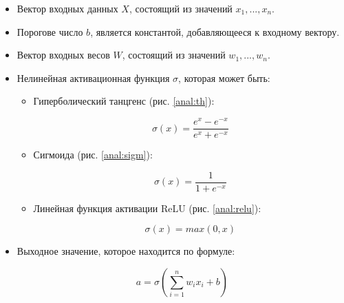 \begin{itemize}
	\item Вектор входных данных $X$, состоящий из значений $x_1, ..., x_n$.
	\item Порогове число $b$, является константой, добавляющееся к входному вектору.
	\item Вектор входных весов $W$, состоящий из значений $w_1, ..., w_n$.
	\item Нелинейная активационная функция $\sigma$, которая может быть:
	\begin{itemize}
		\item Гиперболический танцгенс (рис. \ref{anal:th}):
		
		\begin{equation}
			\sigma(x) = \frac{e^x - e^{-x}}{e^x + e^{-x}}
		\end{equation}
		
		
		\item Сигмоида (рис. \ref{anal:sigm}):
		
		\begin{equation}
		\sigma(x)=\frac{1}{1+e^{-x}}
		\end{equation}
		
		
		\item Линейная функция активации ReLU (рис. \ref{anal:relu}):
		
		\begin{equation}
		\sigma(x) = max(0, x)
		\end{equation}
		
		
	\end{itemize}
	\item Выходное значение, которое находится по формуле:
	
	\begin{equation}
	a = \sigma( \sum_{i=1}^{n}w_ix_i + b )
	\end{equation}
	
\end{itemize}

